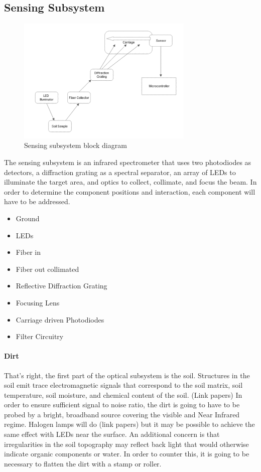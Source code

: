 \subsection{Sensing Subsystem}
\label{sec:sensing_subsystem}
\begin{figure}[H]
    \caption{Sensing subsystem block diagram}
    \centering
    \includegraphics[width=0.75\textwidth]{images/OpticsBlockDiagram.png}
\end{figure}


The sensing subsystem is an infrared spectrometer that uses two photodiodes as detectors, a diffraction grating as a spectral separator, an array of LEDs to illuminate the target area, and optics to collect, collimate, and focus the beam. In order to determine the component positions and interaction, each component will have to be addressed.
    \begin{itemize}
        \item Ground
        \item LEDs
        \item Fiber in
        \item Fiber out collimated
        \item Reflective Diffraction Grating
        \item Focusing Lens
        \item Carriage driven Photodiodes
        \item Filter Circuitry
    \end{itemize}


    \paragraph{Dirt}

That’s right, the first part of the optical subsystem is the soil. Structures in the soil emit trace electromagnetic signals that correspond to the soil matrix, soil temperature, soil moisture, and chemical content of the soil. (Link papers)
In order to ensure sufficient signal to noise ratio, the dirt is going to have to be probed by a bright, broadband source covering the visible and Near Infrared regime. Halogen lamps will do (link papers) but it may be possible to achieve the same effect with LEDs near the surface. 
An additional concern is that irregularities in the soil topography may reflect back light that would otherwise indicate organic components or water. In order to counter this, it is going to be necessary to flatten the dirt with a stamp or roller.


